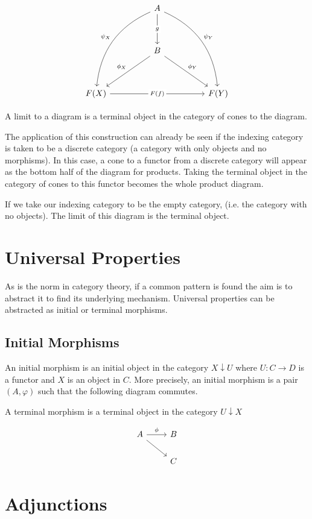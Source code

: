 \documentclass[a4paper,12pt]{article}
\begin{document}
\[\begin{tikzcd}[sep=huge]
     & A \arrow[ldd, "\psi_{X}"', bend right] \arrow[rdd, "\psi_Y", bend left]
     \arrow[d, "g" description] &  \\
      & B \arrow[ld, "\phi_X"'] \arrow[rd, "\phi_Y"] &  \\
      F(X) \arrow[rr, "F(f)" description] &  & F(Y)
\end{tikzcd}\]

A limit to a diagram is a terminal object in the category of cones to the
diagram.

The application of this construction can already be seen if the indexing
category is taken to be a discrete category (a category with only objects and
no morphisms). In this case, a cone to a functor from a discrete category will
appear as the bottom half of the diagram for products. Taking the terminal
object in the category of cones to this functor becomes the whole product
diagram.

If we take our indexing category to be the empty category, (i.e. the category
with no objects). The limit of this diagram is the terminal object.
\section{Universal Properties}
As is the norm in category theory, if a common pattern is found the aim is to
abstract it to find its underlying mechanism. Universal properties can
be abstracted as initial or terminal morphisms.

\subsection{Initial Morphisms}
An initial morphism is an initial object in the category $X \downarrow U$ where
$U : C \rightarrow D$ is a functor and $X$ is an object in $C$. More precisely,
an initial morphism is a pair $(A, \varphi)$ such that the following diagram
commutes.

A terminal morphism is a terminal object in the category $U \downarrow X$

\[\begin{tikzcd}
    A \arrow[rd] \arrow[r, "\phi"] & B \\
                                   & C
\end{tikzcd}\]

\section{Adjunctions}
\end{document}
